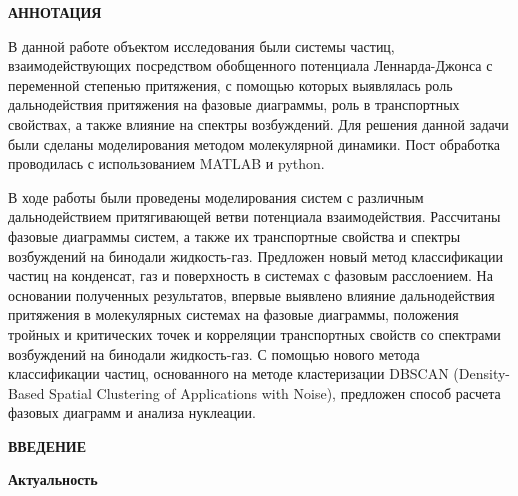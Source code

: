 
\newpage
\begin{center}
\textbf{АННОТАЦИЯ}
\end{center}

В данной работе объектом исследования были системы частиц, взаимодействующих посредством обобщенного потенциала Леннарда-Джонса с переменной степенью притяжения, с помощью которых выявлялась роль дальнодействия притяжения на фазовые диаграммы, роль в транспортных свойствах, а также влияние на спектры возбуждений. Для решения данной задачи были сделаны моделирования методом молекулярной динамики. Пост обработка проводилась с использованием MATLAB и python.

В ходе работы были проведены моделирования систем с различным дальнодействием притягивающей ветви потенциала взаимодействия.
Рассчитаны фазовые диаграммы систем, а также их транспортные свойства и спектры возбуждений на бинодали жидкость-газ.
Предложен новый метод классификации частиц на конденсат, газ и поверхность в системах с фазовым расслоением.
На основании полученных результатов, впервые выявлено влияние дальнодействия притяжения в молекулярных системах на фазовые диаграммы, положения тройных и критических точек и корреляции транспортных свойств со спектрами возбуждений на бинодали жидкость-газ.
С помощью нового метода классификации частиц, основанного на методе кластеризации DBSCAN (Density-Based Spatial Clustering of Applications with Noise), предложен способ расчета фазовых диаграмм и анализа нуклеации.


\onehalfspacing
\setcounter{page}{2}
\renewcommand{\contentsname}{\centerline{\Large{Cодержание}}}
\tableofcontents
{}
\renewcommand{\contentsname}{\centerline{\Large{Cодержание}}}

\newpage
\begin{center}
\textbf{ВВЕДЕНИЕ}
\end{center}


\textbf{Актуальность}

